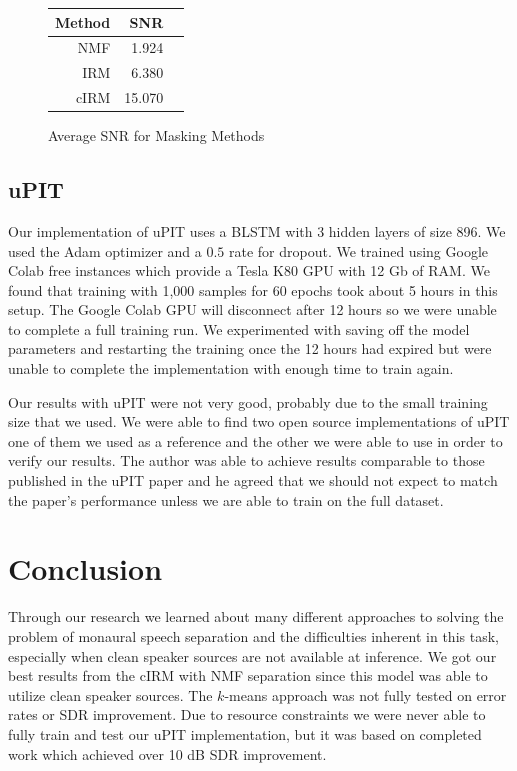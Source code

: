 \documentclass[journal, a4paper]{IEEEtran}
\begin{document}
\begin{figure}[h!]
    \centering  
     \caption{\label{Fig:masking_snr}Average SNR for Masking Methods}  

  \begin{tabular}{r r r}\\
  
        Method & SNR \\
        \midrule
        NMF & 1.924 \\
        IRM & 6.380 \\
        cIRM & 15.070 \\
        \midrule
    \end{tabular}
    
\end{figure}

\subsection{uPIT}

Our implementation of uPIT uses a BLSTM with 3 hidden layers of size 896. We used the Adam optimizer and a $0.5$ rate for dropout. We trained using Google Colab free instances which provide a Tesla K80 GPU with 12 Gb of RAM. We found that training with 1,000 samples for 60 epochs took about 5 hours in this setup. The Google Colab GPU will disconnect after 12 hours so we were unable to complete a full training run. We experimented with saving off the model parameters and restarting the training once the 12 hours had expired but were unable to complete the implementation with enough time to train again.

Our results with uPIT were not very good, probably due to the small training size that we used. We were able to find two open source implementations of uPIT one of them we used as a reference \cite{upit2} and the other \cite{upit1} we were able to use in order to verify our results. The author was able to achieve results comparable to those published in the uPIT paper and he agreed that we should not expect to match the paper's performance unless we are able to train on the full dataset.

\section{Conclusion}
Through our research we learned about many different approaches to solving the problem of monaural speech separation and the difficulties inherent in this task, especially when clean speaker sources are not available at inference. We got our best results from the cIRM with NMF separation since this model was able to utilize clean speaker sources. The $k$-means approach was not fully tested on error rates or SDR improvement. Due to resource constraints we were never able to fully train and test our uPIT implementation, but it was based on completed work which achieved over 10 dB SDR improvement.




\end{document}
